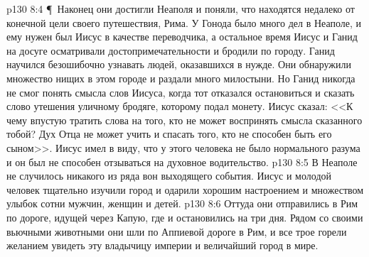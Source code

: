 \vs p130 8:4 \P\ Наконец они достигли Неаполя и поняли, что находятся недалеко от конечной цели своего путешествия, Рима. У Гонода было много дел в Неаполе, и ему нужен был Иисус в качестве переводчика, а остальное время Иисус и Ганид на досуге осматривали достопримечательности и бродили по городу. Ганид научился безошибочно узнавать людей, оказавшихся в нужде. Они обнаружили множество нищих в этом городе и раздали много милостыни. Но Ганид никогда не смог понять смысла слов Иисуса, когда тот отказался остановиться и сказать слово утешения уличному бродяге, которому подал монету. Иисус сказал: <<К чему впустую тратить слова на того, кто не может воспринять смысла сказанного тобой? Дух Отца не может учить и спасать того, кто не способен быть его сыном>>. Иисус имел в виду, что у этого человека не было нормального разума и он был не способен отзываться на духовное водительство.
\vs p130 8:5 В Неаполе не случилось никакого из ряда вон выходящего события. Иисус и молодой человек тщательно изучили город и одарили хорошим настроением и множеством улыбок сотни мужчин, женщин и детей.
\vs p130 8:6 Оттуда они отправились в Рим по дороге, идущей через Капую, где и остановились на три дня. Рядом со своими вьючными животными они шли по Аппиевой дороге в Рим, и все трое горели желанием увидеть эту владычицу империи и величайший город в мире.
